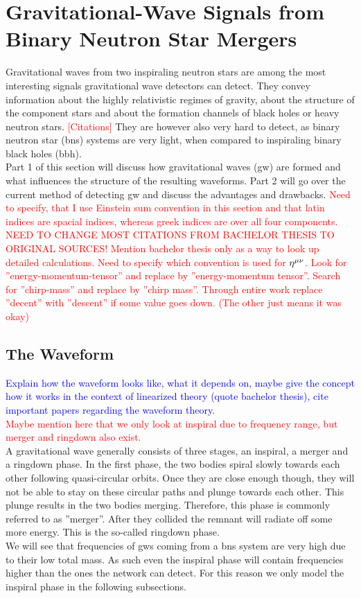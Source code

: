\section{Gravitational-Wave Signals from Binary Neutron Star Mergers}\label{sec:gravitational_waves}
Gravitational waves from two inspiraling neutron stars are among the most interesting signals gravitational wave detectors can detect. They convey information about the highly relativistic regimes of gravity, about the structure of the component stars and about the formation channels of black holes or heavy neutron stars. \textcolor{red}{[Citations]} They are however also very hard to detect, as binary neutron star (\gls{bns}) systems are very light, when compared to inspiraling binary black holes (\gls{bbh}).\\
Part 1 of this section will discuss how gravitational waves (\gls{gw}) are formed and what influences the structure of the resulting waveforms. Part 2 will go over the current method of detecting \gls{gw} and discuss the advantages and drawbacks. \textcolor{red}{Need to specify, that I use Einstein sum convention in this section and that latin indices are spacial indices, whereas greek indices are over all four components. NEED TO CHANGE MOST CITATIONS FROM BACHELOR THESIS TO ORIGINAL SOURCES! Mention bachelor thesis only as a way to look up detailed calculations. Need to specify which convention is used for $\eta^{\mu\nu}$. Look for ''energy-momentum-tensor'' and replace by ''energy-momentum tensor''. Search for ''chirp-mass'' and replace by ''chirp mass''. Through entire work replace ''decent'' with ''descent'' if some value goes down. (The other just means it was okay)}
\subsection{The Waveform}\label{sec:the_waveform}
\textcolor{blue}{Explain how the waveform looks like, what it depends on, maybe give the concept how it works in the context of linearized theory (quote bachelor thesis), cite important papers regarding the waveform theory.}\\
\textcolor{red}{Maybe mention here that we only look at inspiral due to frequency range, but merger and ringdown also exist.}\\
A gravitational wave generally consists of three stages, an inspiral, a merger and a ringdown phase. In the first phase, the two bodies spiral slowly towards each other following quasi-circular orbits. Once they are close enough though, they will not be able to stay on these circular paths and plunge towards each other. This plunge results in the two bodies merging. Therefore, this phase is commonly referred to as ''merger''. After they collided the remnant will radiate off some more energy. This is the so-called ringdown phase.\\
We will see that frequencies of \gls{gw}s coming from a \gls{bns} system are very high due to their low total mass. As such even the inspiral phase will contain frequencies higher than the ones the network can detect. For this reason we only model the inspiral phase in the following subsections.
